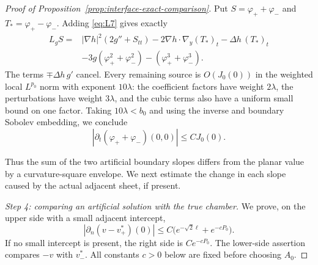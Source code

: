 \begin{proof}[Proof of Proposition~\ref{prop:interface-exact-comparison}]
Put $S=\varphi_++\varphi_-$ and $T_*=\varphi_+-\varphi_-$.
Adding \eqref{eq:L7} gives exactly
\[
 \begin{split}
 L_gS={}&|\nabla h|^2(2g''+S_{tt})
       -2\nabla h\cdot\nabla_y(T_*)_t-\Delta h\,(T_*)_t\\
       &-3g(\varphi_+^2+\varphi_-^2)
                       -(\varphi_+^3+\varphi_-^3).
 \end{split}
\]
The terms $\mp\Delta h\,g'$ cancel.  Every remaining source is
$O(J_0(0))$ in the weighted local $L^{p_0}$ norm with exponent
$10\lambda$: the coefficient factors have weight $2\lambda$,
the perturbations have weight $3\lambda$, and the cubic terms
also have a uniform small bound on one factor.  Taking
$10\lambda<b_0$ and using the inverse and boundary Sobolev embedding,
we conclude
\begin{equation}\label{eq:L8}
 |\partial_t(\varphi_++\varphi_-)(0,0)|\le C J_0(0).
\end{equation}

Thus the sum of the two artificial boundary slopes differs from the
planar value by a curvature-square envelope.  We next estimate the
change in each slope caused by the actual adjacent sheet, if present.

\emph{Step 4: comparing an artificial solution with the true chamber.}
We prove, on the upper side with a small adjacent intercept,
\begin{equation}\label{eq:L9}
 |\partial_n(v-v^*_+)(0)|
       \le C\bigl(e^{-\sqrt2\ell}+e^{-cP_0}\bigr).
\end{equation}
If no small intercept is present, the right side is $Ce^{-cP_0}$.
The lower-side assertion compares $-v$ with $v^*_-$.
All constants $c>0$ below are fixed before choosing $A_0$.


\end{proof}
